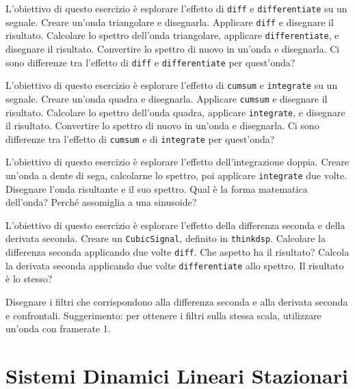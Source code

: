 \documentclass[12pt,a4paper]{book}
\begin{document}
\begin{exercise} L'obiettivo di questo esercizio è esplorare l'effetto di {\tt diff} e {\tt differentiate} su un segnale. Creare un'onda triangolare e disegnarla. Applicare {\tt diff} e disegnare il risultato. Calcolare lo spettro dell'onda triangolare, applicare {\tt differentiate}, e disegnare il risultato. Convertire lo spettro di nuovo in un'onda e disegnarla. Ci sono differenze tra l'effetto di {\tt diff} e {\tt differentiate} per quest'onda? \end{exercise} 

\begin{exercise} L'obiettivo di questo esercizio è esplorare l'effetto di {\tt cumsum} e {\tt integrate} su un segnale. Creare un'onda quadra e disegnarla. Applicare {\tt cumsum} e disegnare il risultato. Calcolare lo spettro dell'onda quadra, applicare {\tt integrate}, e disegnare il risultato. Convertire lo spettro di nuovo in un'onda e disegnarla. Ci sono differenze tra l'effetto di {\tt cumsum} e di {\tt integrate} per quest'onda? \end{exercise} 

\begin{exercise} L'obiettivo di questo esercizio è esplorare l'effetto dell'integrazione doppia. Creare un'onda a dente di sega, calcolarne lo spettro, poi applicare {\tt integrate} due volte. Disegnare l'onda risultante e il suo spettro. Qual è la forma matematica dell'onda? Perché assomiglia a una sinusoide? \end{exercise} 

\begin{exercise} L'obiettivo di questo esercizio è esplorare l'effetto della differenza seconda e della derivata seconda. Creare un {\tt CubicSignal}, definito in {\tt thinkdsp}. Calcolare la differenza seconda applicando due volte {\tt diff}. Che aspetto ha il risultato? Calcola la derivata seconda applicando due volte {\tt differentiate} allo spettro. Il risultato è lo stesso?

Disegnare i filtri che corrispondono alla differenza seconda e alla derivata seconda e confrontali. Suggerimento: per ottenere i filtri sulla stessa scala, utilizzare un'onda con framerate 1. \end{exercise} 

\chapter{Sistemi Dinamici Lineari Stazionari} \label{systems} 
\end{document}

